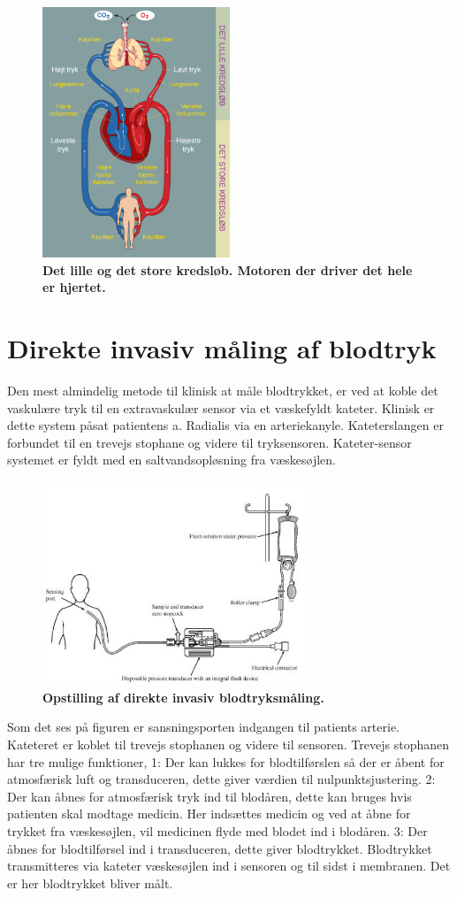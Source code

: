 \begin{figure}[H]
\includegraphics[width =0.5\textwidth , center]{billeder/hjertet}
\caption{\textbf{Det lille og det store kredsløb. Motoren der driver det hele er hjertet. \cite{hjertet}}}
\end{figure}
\section{Direkte invasiv måling af blodtryk}
Den mest almindelig metode til klinisk at måle blodtrykket, er ved at koble det vaskulære tryk til en extravaskulær sensor via et væskefyldt kateter. Klinisk er dette system påsat patientens a. Radialis via en arteriekanyle. Kateterslangen er forbundet til en trevejs stophane og videre til tryksensoren. Kateter-sensor systemet er fyldt med en saltvandsopløsning fra væskesøjlen.
\begin{figure}[H]
\includegraphics[width =0.7\textwidth , center]{billeder/kateter}
\caption{\textbf{Opstilling af direkte invasiv blodtryksmåling.}}
\end{figure}
Som det ses på figuren er sansningsporten indgangen til patients arterie. Kateteret er koblet til trevejs stophanen og videre til sensoren. Trevejs stophanen har tre mulige funktioner, 1: Der kan lukkes for blodtilførslen så der er åbent for atmosfærisk luft og transduceren, dette giver værdien til nulpunktsjustering. 2: Der kan åbnes for atmosfærisk tryk ind til blodåren, dette kan bruges hvis patienten skal modtage medicin. Her indsættes medicin og ved at åbne for trykket fra væskesøjlen, vil medicinen flyde med blodet ind i blodåren. 3: Der åbnes for blodtilførsel ind i transduceren, dette giver blodtrykket. Blodtrykket transmitteres via kateter væskesøjlen ind i sensoren og til sidst i membranen. Det er her blodtrykket bliver målt. 
